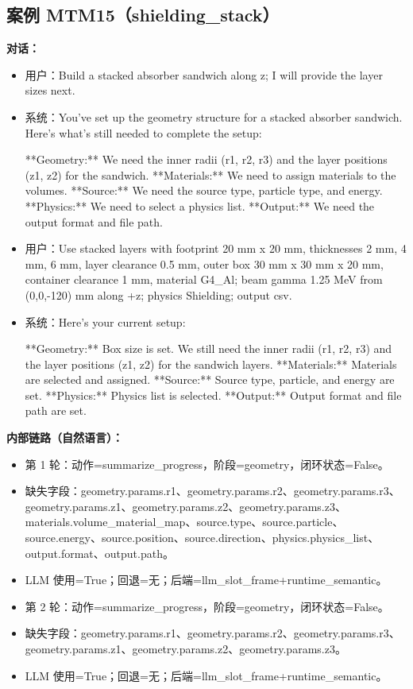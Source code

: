 \documentclass[11pt]{ctexart}
\begin{document}
\subsection{案例 MTM15（shielding\_stack）}
\textbf{对话：}
\begin{itemize}
\item 用户：Build a stacked absorber sandwich along z; I will provide the layer sizes next.
\item 系统：You've set up the geometry structure for a stacked absorber sandwich. Here's what's still needed to complete the setup:

**Geometry:** We need the inner radii (r1, r2, r3) and the layer positions (z1, z2) for the sandwich.
**Materials:** We need to assign materials to the volumes.
**Source:** We need the source type, particle type, and energy.
**Physics:** We need to select a physics list.
**Output:** We need the output format and file path.
\item 用户：Use stacked layers with footprint 20 mm x 20 mm, thicknesses 2 mm, 4 mm, 6 mm, layer clearance 0.5 mm, outer box 30 mm x 30 mm x 20 mm, container clearance 1 mm, material G4\_Al; beam gamma 1.25 MeV from (0,0,-120) mm along +z; physics Shielding; output csv.
\item 系统：Here's your current setup:

**Geometry:** Box size is set. We still need the inner radii (r1, r2, r3) and the layer positions (z1, z2) for the sandwich layers.
**Materials:** Materials are selected and assigned.
**Source:** Source type, particle, and energy are set.
**Physics:** Physics list is selected.
**Output:** Output format and file path are set.
\end{itemize}
\textbf{内部链路（自然语言）：}
\begin{itemize}
\item 第 1 轮：动作=summarize\_progress，阶段=geometry，闭环状态=False。
\item 缺失字段：geometry.params.r1、geometry.params.r2、geometry.params.r3、geometry.params.z1、geometry.params.z2、geometry.params.z3、materials.volume\_material\_map、source.type、source.particle、source.energy、source.position、source.direction、physics.physics\_list、output.format、output.path。
\item LLM 使用=True；回退=无；后端=llm\_slot\_frame+runtime\_semantic。
\item 第 2 轮：动作=summarize\_progress，阶段=geometry，闭环状态=False。
\item 缺失字段：geometry.params.r1、geometry.params.r2、geometry.params.r3、geometry.params.z1、geometry.params.z2、geometry.params.z3。
\item LLM 使用=True；回退=无；后端=llm\_slot\_frame+runtime\_semantic。
\end{itemize}
\end{document}
